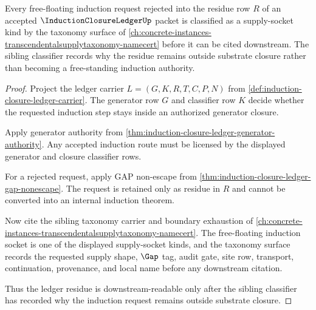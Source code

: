 \begin{theorem}
\label{thm:induction-closure-ledger-transcendental-input-sibling-link}
Every free-floating induction request rejected into the residue row $R$ of an accepted $\InductionClosureLedgerUp$ packet is classified as a supply-socket kind by the taxonomy surface of \autoref{ch:concrete-instances-transcendentalsupplytaxonomy-namecert} before it can be cited downstream. The sibling classifier records why the residue remains outside substrate closure rather than becoming a free-standing induction authority.
\end{theorem}
\begin{proof}
Project the ledger carrier $L=(G,K,R,T,C,P,N)$ from \autoref{def:induction-closure-ledger-carrier}. The generator row $G$ and classifier row $K$ decide whether the requested induction step stays inside an authorized generator closure.

Apply generator authority from \autoref{thm:induction-closure-ledger-generator-authority}. Any accepted induction route must be licensed by the displayed generator and closure classifier rows.

For a rejected request, apply GAP non-escape from \autoref{thm:induction-closure-ledger-gap-nonescape}. The request is retained only as residue in $R$ and cannot be converted into an internal induction theorem.

Now cite the sibling taxonomy carrier and boundary exhaustion of \autoref{ch:concrete-instances-transcendentalsupplytaxonomy-namecert}. The free-floating induction socket is one of the displayed supply-socket kinds, and the taxonomy surface records the requested supply shape, $\Gap$ tag, audit gate, site row, transport, continuation, provenance, and local name before any downstream citation.

Thus the ledger residue is downstream-readable only after the sibling classifier has recorded why the induction request remains outside substrate closure.
\end{proof}

